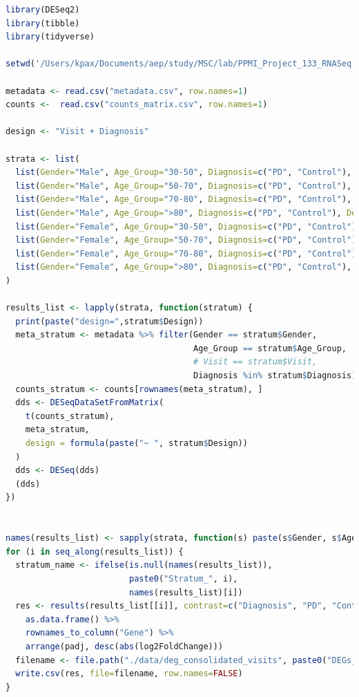 \documentclass[12pt]{report}
\begin{document}
    \begin{lstlisting}[language=R,caption={Main.R: Διαφορική ανάλυση μέσω πακέτου R DESeq2},label=lst:mainr]
library(DESeq2)
library(tibble)
library(tidyverse)

setwd('/Users/kpax/Documents/aep/study/MSC/lab/PPMI_Project_133_RNASeq')

metadata <- read.csv("metadata.csv", row.names=1)
counts <-  read.csv("counts_matrix.csv", row.names=1)

design <- "Visit + Diagnosis"

strata <- list(
  list(Gender="Male", Age_Group="30-50", Diagnosis=c("PD", "Control"), Design=design),
  list(Gender="Male", Age_Group="50-70", Diagnosis=c("PD", "Control"), Design=design),
  list(Gender="Male", Age_Group="70-80", Diagnosis=c("PD", "Control"), Design=design),
  list(Gender="Male", Age_Group=">80", Diagnosis=c("PD", "Control"), Design=design),
  list(Gender="Female", Age_Group="30-50", Diagnosis=c("PD", "Control"), Design=design),
  list(Gender="Female", Age_Group="50-70", Diagnosis=c("PD", "Control"), Design=design),
  list(Gender="Female", Age_Group="70-80", Diagnosis=c("PD", "Control"), Design=design),
  list(Gender="Female", Age_Group=">80", Diagnosis=c("PD", "Control"), Design=design)
)

results_list <- lapply(strata, function(stratum) {
  print(paste("design=",stratum$Design))
  meta_stratum <- metadata %>% filter(Gender == stratum$Gender,
                                      Age_Group == stratum$Age_Group,
                                      # Visit == stratum$Visit,
                                      Diagnosis %in% stratum$Diagnosis)
  counts_stratum <- counts[rownames(meta_stratum), ]
  dds <- DESeqDataSetFromMatrix(
    t(counts_stratum),
    meta_stratum,
    design = formula(paste("~ ", stratum$Design))
  )
  dds <- DESeq(dds)
  (dds)
})


names(results_list) <- sapply(strata, function(s) paste(s$Gender, s$Age_Group, sep="_"))
for (i in seq_along(results_list)) {
  stratum_name <- ifelse(is.null(names(results_list)),
                         paste0("Stratum_", i),
                         names(results_list)[i])
  res <- results(results_list[[i]], contrast=c("Diagnosis", "PD", "Control")) %>%
    as.data.frame() %>%
    rownames_to_column("Gene") %>%
    arrange(padj, desc(abs(log2FoldChange)))
  filename <- file.path("./data/deg_consolidated_visits", paste0("DEGs_stratified_consoVisits_", stratum_name, ".csv"))
  write.csv(res, file=filename, row.names=FALSE)
}
    \end{lstlisting}
\end{document}
